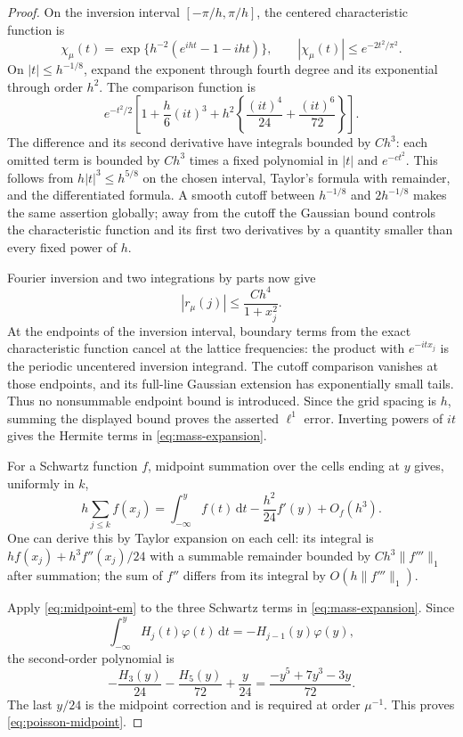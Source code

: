 \documentclass[11pt]{article}
\newcommand{\dd}{\,\mathrm d}
\theoremstyle{remark}
\begin{document}
\begin{proof}
On the inversion interval $[-\pi/h,\pi/h]$, the centered characteristic function is
\[
 \chi_\mu(t)=\exp\{h^{-2}(e^{iht}-1-iht)\},\qquad
 |\chi_\mu(t)|\le e^{-2t^2/\pi^2}.
\]
On $|t|\le h^{-1/8}$, expand the exponent through fourth degree and its exponential through order $h^2$. The comparison function is
\[
 e^{-t^2/2}\left[1+\frac h6(it)^3
 +h^2\left\{\frac{(it)^4}{24}+\frac{(it)^6}{72}\right\}\right].
\]
The difference and its second derivative have integrals bounded by $Ch^3$: each omitted term is bounded by $Ch^3$ times a fixed polynomial in $|t|$ and $e^{-ct^2}$. This follows from $h|t|^3\le h^{5/8}$ on the chosen interval, Taylor's formula with remainder, and the differentiated formula. A smooth cutoff between $h^{-1/8}$ and $2h^{-1/8}$ makes the same assertion globally; away from the cutoff the Gaussian bound controls the characteristic function and its first two derivatives by a quantity smaller than every fixed power of $h$.

Fourier inversion and two integrations by parts now give
\[
 |r_\mu(j)|\le\frac{Ch^4}{1+x_j^2}.
\]
At the endpoints of the inversion interval, boundary terms from the exact characteristic function cancel at the lattice frequencies: the product with $e^{-itx_j}$ is the periodic uncentered inversion integrand. The cutoff comparison vanishes at those endpoints, and its full-line Gaussian extension has exponentially small tails. Thus no nonsummable endpoint bound is introduced. Since the grid spacing is $h$, summing the displayed bound proves the asserted $\ell^1$ error. Inverting powers of $it$ gives the Hermite terms in \eqref{eq:mass-expansion}.

For a Schwartz function $f$, midpoint summation over the cells ending at $y$ gives, uniformly in $k$,
\begin{equation}\label{eq:midpoint-em}
 h\sum_{j\le k}f(x_j)=\int_{-\infty}^y f(t)\dd t
 -\frac{h^2}{24}f'(y)+O_f(h^3).
\end{equation}
One can derive this by Taylor expansion on each cell: its integral is $hf(x_j)+h^3f''(x_j)/24$ with a summable remainder bounded by $Ch^3\|f'''\|_1$ after summation; the sum of $f''$ differs from its integral by $O(h\|f'''\|_1)$.

Apply \eqref{eq:midpoint-em} to the three Schwartz terms in \eqref{eq:mass-expansion}. Since
\[
 \int_{-\infty}^yH_j(t)\varphi(t)\dd t=-H_{j-1}(y)\varphi(y),
\]
the second-order polynomial is
\[
 -\frac{H_3(y)}{24}-\frac{H_5(y)}{72}+\frac y{24}
 =\frac{-y^5+7y^3-3y}{72}.
\]
The last $y/24$ is the midpoint correction and is required at order $\mu^{-1}$. This proves \eqref{eq:poisson-midpoint}.
\end{proof}
\end{document}
